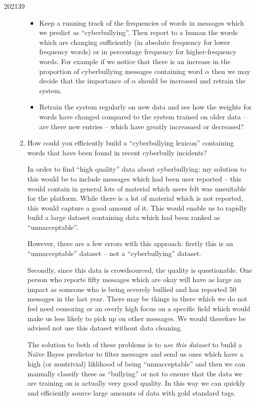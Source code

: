 \documentclass[10pt,\jkfside,a4paper]{article}
\begin{document}
\begin{examquestion}{2021}{3}{9}
\begin{enumerate}
\begin{enumerate}
\begin{itemize}
\item Keep a running track of the frequencies of words in messages which we predict as ``cyberbullying''. 
Then report to a human the words which are changing sufficiently (in absolute frequency for lower frequency words) 
or in percentage frequency for higher-frequency words. For example if we notice that there is an increase in the 
proportion of cyberbullying messages containing word $\alpha$ then we may decide that the importance of $\alpha$ 
should be increased and retrain the system.

\item Retrain the system regularly on new data and see how the weights for words have changed compared to the 
system trained on older data -- are there new entries -- which have greatly increasaed or decreased?

\end{itemize}

\item How could you efficiently build a “cyberbullying lexicon” containing words
that have been found in recent cyberbully incidents?

In order to find ``high quality'' data about cyberbullying: my solution to this would be to include messages 
which had been user reported -- this would contain in general lots of material which users felt was unsuitable 
for the platform. While there is a lot of material which is not 
reported, this would capture a good amount of it. This would enable us to rapidly build a large dataset containing 
data which had been ranked as ``unnacceptable''. 

However, there are a few errors with this approach: firstly this is an ``unnacceptable'' dataset -- not a ``cyberbullying'' 
dataset. 

Secondly, since this data is crowdsourced, the quality is questionable. One person who reports fifty messages which are okay 
will have as large an impact as someone who is being severely bullied and has reported 50 messages in the last year. 
There may be things in there which we do not feel need censoring or an overly high focus on a specific field which would 
make us less likely to pick up on other messages. We would therefore be advised not use this dataset without data cleaning.

The solution to both of these problems is to \textit{use this dataset} to build a Na\"ive Bayes predictor to filter messages and send us ones which have 
a high (or nontrivial) liklihood of being ``unnacceptable'' and then we can manually classify these as ``bullying'' or not to ensure that 
the data we are training on is actually very good quality. In this way we can quickly and efficiently source large amounts of data 
with gold standard tags.


\end{enumerate}
\end{enumerate}
\end{examquestion}
\end{document}
